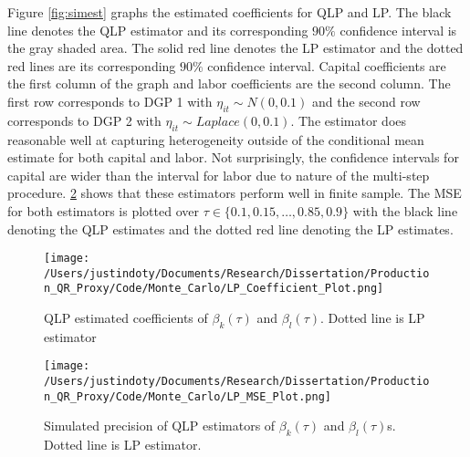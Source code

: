 \documentclass[11pt]{article}
\begin{document}
Figure \ref{fig:simest} graphs the estimated coefficients for QLP and LP. The black line denotes the QLP estimator and its corresponding $90\%$ confidence interval is the gray shaded area. The solid red line denotes the LP estimator and the dotted red lines are its corresponding $90\%$ confidence interval. Capital coefficients are the first column of the graph and labor coefficients are the second column. The first row corresponds to DGP 1 with $\eta_{it}\sim N(0,0.1)$ and the second row corresponds to DGP 2 with $\eta_{it}\sim Laplace(0,0.1)$. The estimator does reasonable well at capturing heterogeneity outside of the conditional mean estimate for both capital and labor. Not surprisingly, the confidence intervals for capital are wider than the interval for labor due to nature of the multi-step procedure. \ref{fig:MSE}  shows that these estimators perform well in finite sample. The MSE for both estimators is plotted over $\tau\in\{0.1, 0.15, \dots, 0.85, 0.9\}$ with the black line denoting the QLP estimates and the dotted red line denoting the LP estimates.

\begin{figure}[H] 
\centering
\caption{QLP estimated coefficients of  $\beta_{k}(\tau)$ and $\beta_{l}(\tau)$. Dotted line is LP estimator}
\label{fig:simest}
\texttt{[image: /Users/justindoty/Documents/Research/Dissertation/Production\_QR\_Proxy/Code/Monte\_Carlo/LP\_Coefficient\_Plot.png]}
\label{LP_coefficient_plot}
\end{figure}


\begin{figure}[H]
\centering
\caption{Simulated precision of  QLP estimators of $\beta_{k}(\tau)$ and $\beta_{l}(\tau)$s. Dotted line is LP estimator.}
\texttt{[image: /Users/justindoty/Documents/Research/Dissertation/Production\_QR\_Proxy/Code/Monte\_Carlo/LP\_MSE\_Plot.png]}
\label{fig:MSE}
\end{figure}

\newpage
\end{document}
